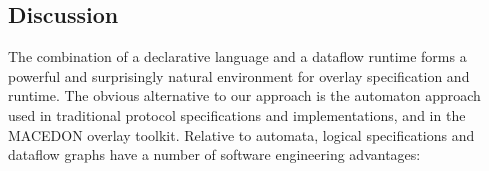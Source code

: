 \documentclass{sig-alt-full}
\def\Sys{P2\xspace}
\newcommand{\note}[1]{}
\begin{document}
% 
% 
% 


% 

\subsection{Discussion}
\label{sec:approach-discuss}
The combination of a declarative language and a
 dataflow runtime forms a powerful and surprisingly natural
 environment for overlay specification and runtime.  The obvious
 alternative to our approach is the automaton approach used in
 traditional protocol specifications and implementations, and in the
 MACEDON overlay toolkit.  Relative to automata, logical
 specifications and dataflow graphs have a number of software
 engineering advantages:
\end{document}
